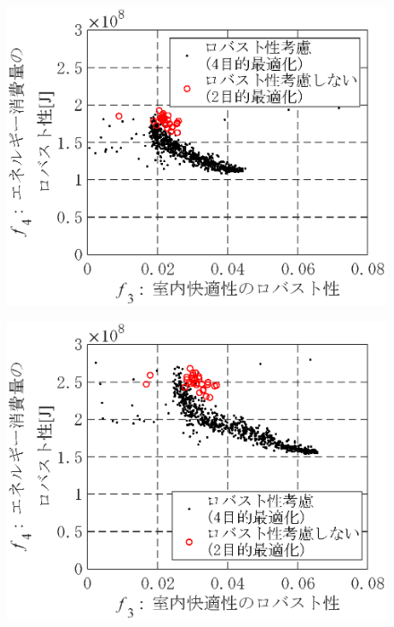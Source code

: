 \begin{figure}[htbp]
    \begin{center}
        \begin{minipage}{0.3\textwidth}
            \begin{center}
                \includegraphics[width=1\textwidth,keepaspectratio=true]{fig/robust_result_pareto_f3f4_10_1.eps}\\\vspace{-3mm}{\small (a)上方誤差があった場合1}
            \end{center}
        \end{minipage}
        \begin{minipage}{0.3\textwidth}
            \begin{center}
                \includegraphics[width=1\textwidth,keepaspectratio=true]{fig/robust_result_pareto_f3f4_10_2.eps}\\\vspace{-3mm}{\small (b)上方誤差があった場合2}

\end{center}
\end{minipage}
\end{center}
\end{figure}
